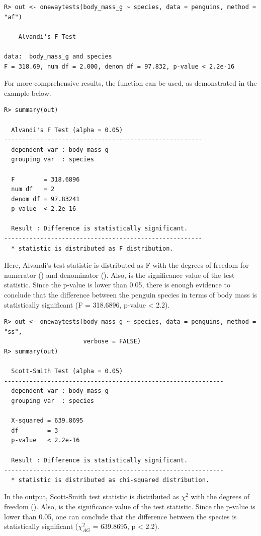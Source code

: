 \begin{verbatim}
R> out <- onewaytests(body_mass_g ~ species, data = penguins, method = "af")

	Alvandi's F Test

data:  body_mass_g and species
F = 318.69, num df = 2.000, denom df = 97.832, p-value < 2.2e-16
\end{verbatim}

For more comprehensive results, the  function can be used, as demonstrated in the example below. 

\begin{verbatim}
R> summary(out)

  Alvandi's F Test (alpha = 0.05) 
------------------------------------------------------- 
  dependent var : body_mass_g 
  grouping var  : species 

  F        = 318.6896 
  num df   = 2 
  denom df = 97.83241 
  p-value  < 2.2e-16

  Result : Difference is statistically significant. 
-------------------------------------------------------
  * statistic is distributed as F distribution.
\end{verbatim}

Here, Alvandi's test statistic is distributed as F with the degrees of freedom for numerator () and denominator (). Also,  is the significance value of the test statistic. Since the p-value is lower than 0.05, there is enough evidence to conclude that  the difference between the penguin species in terms of body mass is statistically significant (F = 318.6896, p-value < 2.2). 

\begin{verbatim}
R> out <- onewaytests(body_mass_g ~ species, data = penguins, method = "ss", 
                      verbose = FALSE)
R> summary(out)

  Scott-Smith Test (alpha = 0.05) 
------------------------------------------------------------- 
  dependent var : body_mass_g 
  grouping var  : species 

  X-squared = 639.8695 
  df        = 3 
  p-value   < 2.2e-16

  Result : Difference is statistically significant. 
------------------------------------------------------------- 
  * statistic is distributed as chi-squared distribution. 
\end{verbatim}

In the output, Scott-Smith test statistic is distributed as $\chi^2$ with the degrees of freedom (). Also,  is the significance value of the test statistic. Since the p-value is lower than 0.05, one can conclude that the difference between the species is statistically significant  ({$\chi_{AG}^2$} = 639.8695, p < 2.2).

